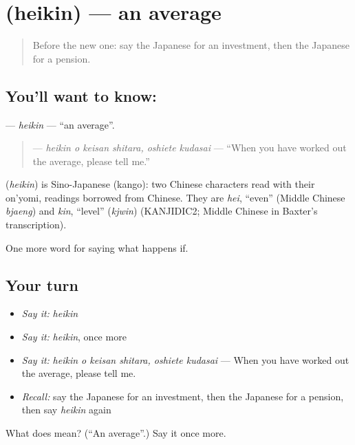 \section[\texorpdfstring{\ja{へいきん} (heikin)}{へいきん (heikin)}]{ (heikin) — an average}

\label{lesson:JA-C365-heikin}



\begin{quote}
Before the new one: say the Japanese for an investment, then the Japanese for a pension.
\end{quote}

\subsection*{You'll want to know: }
\textbf{} — \emph{heikin} — \textquotedblleft{}an average\textquotedblright{}.

\begin{quote}
\textbf{  } — \emph{heikin o keisan shitara, oshiete kudasai} — \textquotedblleft{}When you have worked out the average, please tell me.\textquotedblright{}
\end{quote}

\begin{cousinweb}
\textbf{} (\emph{heikin}) is Sino-Japanese (kango): two Chinese characters read with their on'yomi, readings borrowed from Chinese. They are \emph{hei}, \textquotedblleft{}even\textquotedblright{} (Middle Chinese \emph{bjaeng}) and \emph{kin}, \textquotedblleft{}level\textquotedblright{} (\emph{kjwin}) (KANJIDIC2; Middle Chinese in Baxter's transcription).
\end{cousinweb}

\begin{grammarlens}[title={What you've built}]
One more word for saying what happens if.
\end{grammarlens}

\subsection*{Your turn}
\begin{itemize}
\raggedright
  \item \emph{Say it:} \emph{heikin}
  \item \emph{Say it:} \emph{heikin}, once more
  \item \emph{Say it:} \emph{heikin o keisan shitara, oshiete kudasai} — When you have worked out the average, please tell me.
  \item \emph{Recall:} say the Japanese for an investment, then the Japanese for a pension, then say \emph{heikin} again
\end{itemize}

\begin{tcolorbox}[breakable,colback=teal!4,colframe=teal!35!black,title={Before you move on}]
What does  mean? (\textquotedblleft{}An average\textquotedblright{}.) Say it once more.
\end{tcolorbox}
